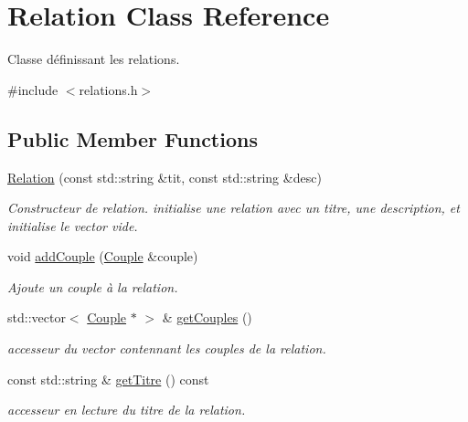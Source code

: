 \hypertarget{class_relation}{}\section{Relation Class Reference}
\label{class_relation}


Classe définissant les relations.  




{\ttfamily \#include $<$relations.\+h$>$}

\subsection*{Public Member Functions}
\begin{DoxyCompactItemize}
\item 
\hyperlink{class_relation_ad80d3956dac01f647bdbb740fdd1cf73}{Relation} (const std\+::string \&tit, const std\+::string \&desc)
\begin{DoxyCompactList}\small\item\em Constructeur de relation. initialise une relation avec un titre, une description, et initialise le vector vide. \end{DoxyCompactList}\item 
void \hyperlink{class_relation_ad51e21a7258d6980f479dbb21f9e510c}{add\+Couple} (\hyperlink{class_couple}{Couple} \&couple)
\begin{DoxyCompactList}\small\item\em Ajoute un couple à la relation. \end{DoxyCompactList}\item 
\mbox{\label{class_relation_a5801afed8aa44bde9fd31db7fc019e17}} 
std\+::vector$<$ \hyperlink{class_couple}{Couple} $\ast$ $>$ \& \hyperlink{class_relation_a5801afed8aa44bde9fd31db7fc019e17}{get\+Couples} ()
\begin{DoxyCompactList}\small\item\em accesseur du vector contennant les couples de la relation. \end{DoxyCompactList}\item 
\mbox{\label{class_relation_a5cc64235be3be20a82e9ec07486b289c}} 
const std\+::string \& \hyperlink{class_relation_a5cc64235be3be20a82e9ec07486b289c}{get\+Titre} () const
\begin{DoxyCompactList}\small\item\em accesseur en lecture du titre de la relation. \end{DoxyCompactList}\item 

\end{DoxyCompactItemize}
